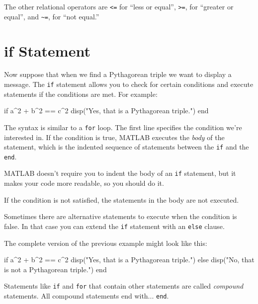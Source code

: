 The other relational operators are {\tt <=} for ``less or equal'', {\tt >=}, for ``greater or equal'', and  \verb+~=+, for ``not equal.''


\section{if Statement}


Now suppose that when we find a Pythagorean triple we want to display a message.
The {\tt if} statement allows you to check for certain conditions
and execute statements if the conditions are met.  For example:

\begin{code}
if a^2 + b^2 == c^2
    disp("Yes, that is a Pythagorean triple.")
end
\end{code}

The syntax is similar to a {\tt for} loop.  The first line
specifies the condition we're interested in.  If the condition is true, 
MATLAB executes the {\em body} of the statement, which is the indented sequence of
statements between the {\tt if} and the {\tt end}.


MATLAB doesn't require you to indent the body of an {\tt if}
statement, but it makes your code more readable, so you should do it.

If the condition is not satisfied, the statements in the body are
not executed. 

Sometimes there are alternative statements to
execute when the condition is false.  In that case you can extend
the {\tt if} statement with an {\tt else} clause.


The complete version of the previous example might look like this:

\begin{code}
if a^2 + b^2 == c^2
    disp("Yes, that is a Pythagorean triple.")
else
    disp("No, that is not a Pythagorean triple.")
end
\end{code}

Statements like {\tt if} and {\tt for} that contain other statements
are called \emph{compound} statements.  All compound statements end
with... {\tt end}.




